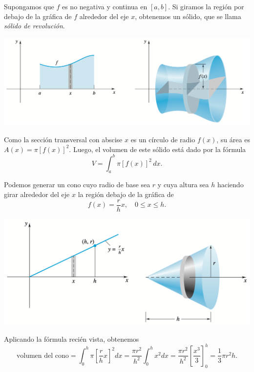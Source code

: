 Supongamos que $f$ es no negativa y continua en $[a, b]$. Si giramos la región por debajo de la gráfica de $f$ alrededor del eje $x$, obtenemos un sólido, que se llama \emph{sólido de revolución}.

\begin{center}
  \includegraphics[width=.8\textwidth]{pics/solido-de-revolucion.png}
\end{center}

Como la sección transversal con abscise $x$ es un círculo de radio $f(x)$, su área es $A(x) = \pi [f(x)]^2$.
Luego, el volumen de este sólido está dado por la fórmula
\begin{equation}
V = \int_a^b \pi [f(x)]^2 \, dx.
\label{eq:volumen_solido_revolucion}
\end{equation}

\begin{example}
  Podemos generar un cono cuyo radio de base sea $r$ y cuya altura sea $h$ haciendo girar alrededor del eje $x$ la región debajo de la gráfica de 
$$f(x) = \frac{r}{h}x, \quad 0 \leq x \leq h.$$

\begin{center}
  \includegraphics[width=.8\textwidth]{pics/cono-de-revolucion.png}
\end{center}

Aplicando la fórmula recién vista, obtenemos
\[
\text{volumen del cono} = \int_0^h \pi \left[\frac{r}{h}x\right]^2 dx = \frac{\pi r^2}{h^2} \int_0^h x^2 dx
= \frac{\pi r^2}{h^2} \left[\frac{x^3}{3}\right]_0^h = \frac{1}{3}\pi r^2 h.
\]
\end{example}

